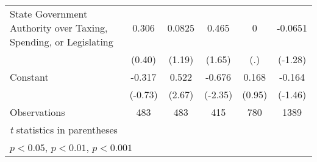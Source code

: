 {\begin{tabular*}{\linewidth}{@{\hskip\tabcolsep\extracolsep\fill}l*{5}{c}}
\addlinespace
State Government Authority over Taxing, Spending, or Legislating&    0.306         &   0.0825         &    0.465         &        0         &  -0.0651         \\
                &   (0.40)         &   (1.19)         &   (1.65)         &      (.)         &  (-1.28)         \\
\addlinespace
Constant        &   -0.317         &    0.522\sym{**} &   -0.676\sym{*}  &    0.168         &   -0.164         \\
                &  (-0.73)         &   (2.67)         &  (-2.35)         &   (0.95)         &  (-1.46)         \\
\midrule
Observations    &      483         &      483         &      415         &      780         &     1389         \\
\bottomrule
\multicolumn{6}{l}{\footnotesize \textit{t} statistics in parentheses}\\
\multicolumn{6}{l}{\footnotesize \sym{*} \(p<0.05\), \sym{**} \(p<0.01\), \sym{***} \(p<0.001\)}\\
\end{tabular*}
}
